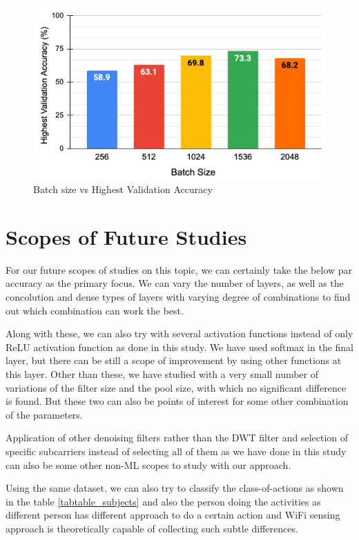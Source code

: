 \documentclass[conference]{IEEEtran}
\begin{document}
\begin{figure}[htbp]
\centerline{\includegraphics[scale=0.22]{images/bs_acc_highest.png}}
\caption{Batch size vs Highest Validation Accuracy}
\label{fig_result_highest}
\end{figure}


\section{Scopes of Future Studies}
For our future scopes of studies on this topic, we can certainly take the below par accuracy as the primary focus. We can vary the number of layers, as well as the concolution and dense types of layers with varying degree of combinations to find out which combination can work the best.

Along with these, we can also try with several activation functions instead of only ReLU activation function as done in this study. We have used softmax in the final layer, but there can be still a scope of improvement by using other functions at this layer. Other than these, we have studied with a very small number of variations of the filter size and the pool size, with which no significant difference is found. But these two can also be points of interest for some other combination of the parameters. 

Application of other denoising filters rather than the DWT filter and selection of specific subcarriers instead of selecting all of them as we have done in this study can also be some other non-ML scopes to study with our approach.

Using the same dataset, we can also try to classify the class-of-actions as shown in the table \ref{tabtable_subjects} and also the person doing the activities as different person has different approach to do a certain action and WiFi sensing approach is theoretically capable of collecting such subtle differences.
\end{document}
